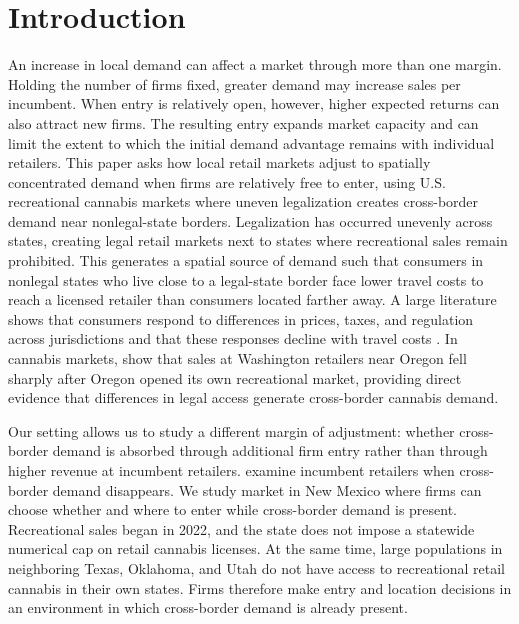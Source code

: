 \documentclass[english,12pt]{article}
\begin{document}
\doublespacing
\newpage

\section{Introduction}


An increase in local demand can affect a market through more than one margin. Holding the number of firms fixed, greater demand may increase sales per incumbent. When entry is relatively open, however, higher expected returns can also attract new firms. The resulting entry expands market capacity and can limit the extent to which the initial demand advantage remains with individual retailers. This paper asks how local retail markets adjust to spatially concentrated demand when firms are relatively free to enter, using U.S. recreational cannabis markets where uneven legalization creates cross-border demand near nonlegal-state borders. Legalization has occurred unevenly across states, creating legal retail markets next to states where recreational sales remain prohibited. This generates a spatial source of demand such that consumers in nonlegal states who live close to a legal-state border face lower travel costs to reach a licensed retailer than consumers located farther away. A large literature shows that consumers respond to differences in prices, taxes, and regulation across jurisdictions and that these responses decline with travel costs \citep{AsplundFribergWilander2007,Lovenheim2008,ChandraHeadTappata2014}. In cannabis markets, \citet{HansenMillerWeber2020} show that sales at Washington retailers near Oregon fell sharply after Oregon opened its own recreational market, providing direct evidence that differences in legal access generate cross-border cannabis demand.

Our setting allows us to study a different margin of adjustment: whether cross-border demand is absorbed through additional firm entry rather than through higher revenue at incumbent retailers. \citet{HansenMillerWeber2020} examine incumbent retailers when cross-border demand disappears. We study market in New Mexico where firms can choose whether and where to enter while cross-border demand is present. Recreational sales began in 2022, and the state does not impose a statewide numerical cap on retail cannabis licenses. At the same time, large populations in neighboring Texas, Oklahoma, and Utah do not have access to recreational retail cannabis in their own states. Firms therefore make entry and location decisions in an environment in which cross-border demand is already present.
\end{document}
